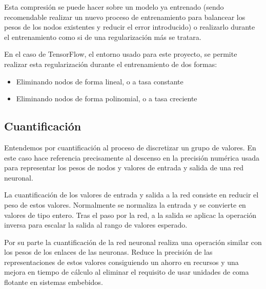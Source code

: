 \documentclass[../tfm.tex]{subfiles}
\begin{document}
Esta compresión se puede hacer sobre un modelo ya entrenado (sendo recomendable realizar un nuevo proceso de entrenamiento para balancear los pesos de los nodos existentes y reducir el error introducido) o realizarlo durante el entrenamiento como si de una regularización más se tratara.

En el caso de TensorFlow, el entorno usado para este proyecto, se permite realizar esta regularización durante el entrenamiento de dos formas:

\begin{itemize}
\item Eliminando nodos de forma lineal, o a tasa constante
\item Eliminando nodos de forma polinomial, o a tasa creciente
\end{itemize}

\subsection{Cuantificación}
Entendemos por cuantificación al proceso de discretizar un grupo de valores. En este caso hace referencia precisamente al descenso en la precisión numérica usada para representar los pesos de nodos y valores de entrada y salida de una red neuronal.

La cuantificación de los valores de entrada y salida a la red consiste en reducir el peso de estos valores. Normalmente se normaliza la entrada y se convierte en valores de tipo entero. Tras el paso por la red, a la salida se aplicac la operación inversa para escalar la salida al rango de valores esperado.

Por su parte la cuantificación de la red neuronal realiza una operación similar con los pesos de los enlaces de las neuronas. Reduce la precisión de las representaciones de estos valores consiguiendo un ahorro en recursos y una mejora en tiempo de cálculo al eliminar el requisito de usar unidades de coma flotante en sistemas embebidos.
\end{document}
